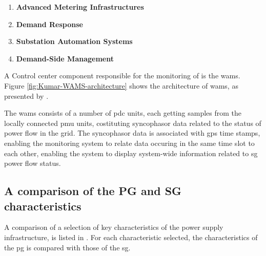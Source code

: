 \begin{enumerate}
    \item \textbf{Advanced Metering Infrastructures}
    \item \textbf{Demand Response}
    \item \textbf{Substation Automation Systems}
    \item \textbf{Demand-Side Management}

\end{enumerate}







A Control center component responsible for the monitoring of is the \acrfull{wams}.\\


Figure \ref{fig:Kumar-WAMS-architecture} shows the architecture of \acrshort{wams}, as presented by \cite{kumar2015monitoring}.

The \acrfull{wams} consists of a number of \acrfull{pdc} units, each getting samples from the locally connected \acrfull{pmu} units, costituting syncophasor data related to the status of power flow in the grid. The syncophasor data is associated with \acrfull{gps} time stamps, enabling the monitoring system to  relate data occuring in the same time slot to each other, enabling the system to display system-wide information related to \acrshort{sg} power flow status. 














\subsection{A comparison of the PG and SG characteristics}
A comparison of a selection of key characteristics of the power supply infrastructure, is listed in \cite{momoh2012smart}. For each characteristic selected, the  characteristics of the \acrlong{pg} is compared with  those of the \acrlong{sg}.





